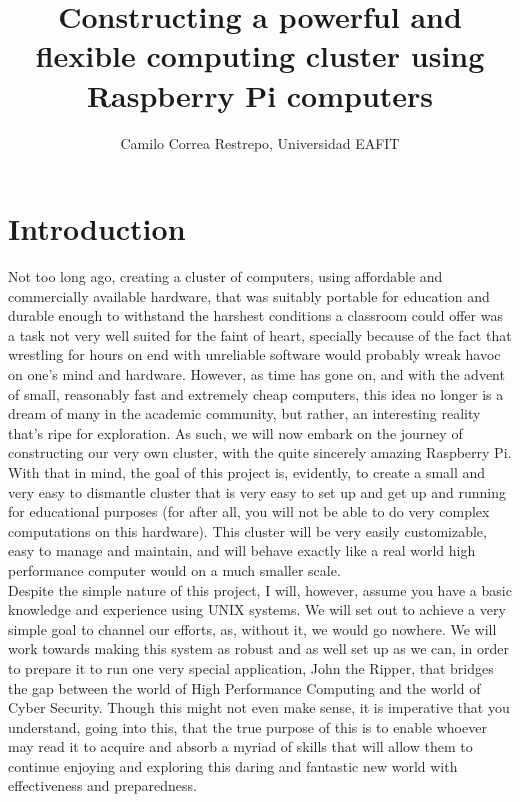 \documentclass[]{article}
\title{Constructing a powerful and flexible computing cluster using Raspberry Pi computers}
\author{Camilo Correa Restrepo, Universidad EAFIT}
\begin{document}
\maketitle

\section{Introduction}
Not too long ago, creating a cluster of computers, using affordable and commercially available hardware,
    that was suitably portable for education and durable enough to withstand the harshest conditions a classroom
    could offer was a task not very well suited for the faint of heart, specially because of the fact that
    wrestling for hours on end with unreliable software would probably wreak havoc on one's mind and hardware.
    However, as time has gone on, and with the advent of small, reasonably fast and extremely cheap computers, this idea
    no longer is a dream of many in the academic community, but rather, an interesting reality that's ripe for
    exploration. As such, we will now embark on the journey of constructing our very own cluster, with the quite
    sincerely amazing Raspberry Pi. With that in mind, the goal of this project is, evidently, to create a small
    and very easy to dismantle cluster that is very easy to set up and get up and running for educational
    purposes (for after all, you will not be able to do very complex computations on this hardware). This cluster will be very easily 
    customizable, easy to manage and maintain, and will behave exactly like a real world high performance computer would on a much smaller 
    scale. \\

    Despite the simple nature of this project, I will, however, assume you have a basic knowledge and experience 
    using UNIX systems. We will set out to achieve a very simple goal to channel our efforts, as, without it,
    we would go nowhere. We will work towards making this system as robust and as well set up as we can, in order to prepare it to run one very special application, John the Ripper, that bridges the gap between the world of High Performance Computing and the world of Cyber Security. Though this might not even make sense, it is imperative that you understand, going into this, that the true purpose of this is to enable whoever may read it to acquire and absorb a myriad of skills that will allow them to continue enjoying and exploring this daring and fantastic new world with effectiveness and preparedness.
\end{document}
